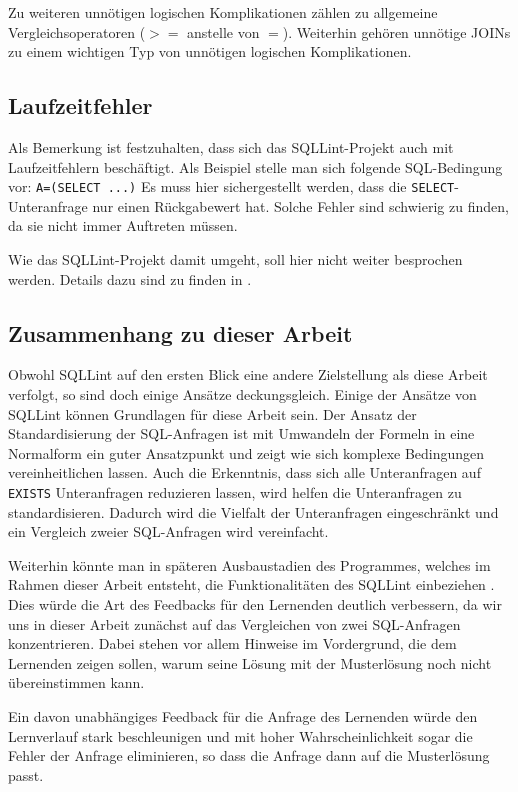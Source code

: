 Zu weiteren unnötigen logischen Komplikationen zählen zu allgemeine Vergleichsoperatoren ($>=$ anstelle von $=$). Weiterhin gehören unnötige JOINs zu einem wichtigen Typ von unnötigen logischen Komplikationen.

\subsection{Laufzeitfehler}

Als Bemerkung ist festzuhalten, dass sich das SQLLint-Projekt auch mit Laufzeitfehlern beschäftigt. Als Beispiel stelle man sich folgende SQL-Bedingung vor: \verb|A=(SELECT ...)| Es muss hier sichergestellt werden, dass die \verb|SELECT|-Unteranfrage nur einen Rückgabewert hat. Solche Fehler sind schwierig zu finden, da sie nicht immer Auftreten müssen. 

Wie das SQLLint-Projekt damit umgeht, soll hier nicht weiter besprochen werden. Details dazu sind zu finden in \cite{brass2}. 

\subsection*{Zusammenhang zu dieser Arbeit}

Obwohl SQLLint auf den ersten Blick eine andere Zielstellung als diese Arbeit verfolgt, so sind doch einige Ansätze deckungsgleich. Einige der Ansätze von SQLLint können Grundlagen für diese Arbeit sein. Der Ansatz der Standardisierung der SQL-Anfragen ist mit Umwandeln der Formeln in eine Normalform ein guter Ansatzpunkt und zeigt wie sich komplexe Bedingungen vereinheitlichen lassen. Auch die Erkenntnis, dass sich alle Unteranfragen auf \verb|EXISTS| Unteranfragen reduzieren lassen, wird helfen die Unteranfragen zu standardisieren. Dadurch wird die Vielfalt der Unteranfragen eingeschränkt und ein Vergleich zweier SQL-Anfragen wird vereinfacht.

Weiterhin könnte man in späteren Ausbaustadien des Programmes, welches im Rahmen dieser Arbeit entsteht, die Funktionalitäten des SQLLint einbeziehen . Dies würde die Art des Feedbacks für den Lernenden deutlich verbessern, da wir uns in dieser Arbeit zunächst auf das Vergleichen von zwei SQL-Anfragen konzentrieren. Dabei stehen vor allem Hinweise im Vordergrund, die dem Lernenden zeigen sollen, warum seine Lösung mit der Musterlösung noch nicht übereinstimmen kann.

Ein davon unabhängiges Feedback für die Anfrage des Lernenden würde den Lernverlauf stark beschleunigen und mit hoher Wahrscheinlichkeit sogar die Fehler der Anfrage eliminieren, so dass die Anfrage dann auf die Musterlösung passt.